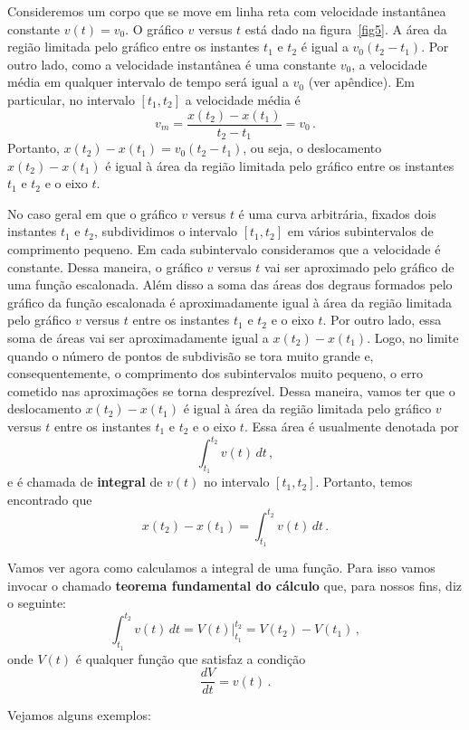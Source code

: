 \documentclass[fontsize=12pt]{scrartcl}
\begin{document}
Consideremos um corpo que se move em linha reta com velocidade
instantânea constante $v(t)=v_0$. O gráfico $v$ versus $t$ está dado
na figura~\ref{fig5}. A área da região limitada pelo gráfico entre os
instantes $t_1$ e $t_2$ é igual a $v_0(t_2-t_1)$. Por outro lado, como
a velocidade instantânea é uma constante $v_0$, a velocidade média em
qualquer intervalo de tempo será igual a $v_0$ (ver apêndice). Em
particular, no intervalo $[t_1,t_2]$ a velocidade média é
$$v_m=\frac{x(t_2)-x(t_1)}{t_2-t_1}=v_0\,.$$
Portanto, $x(t_2)-x(t_1)=v_0(t_2-t_1)$, ou seja, o deslocamento
$x(t_2)-x(t_1)$ é igual à área da região limitada pelo gráfico entre
os instantes $t_1$ e $t_2$ e o eixo $t$.

No caso geral em que o gráfico $v$ versus $t$ é uma curva arbitrária,
fixados dois instantes $t_1$ e $t_2$, subdividimos o intervalo
$[t_1,t_2]$ em vários subintervalos de comprimento pequeno. Em cada
subintervalo consideramos que a velocidade é constante. Dessa maneira,
o gráfico $v$ versus $t$ vai ser aproximado pelo gráfico de uma função
escalonada. Além disso a soma das áreas dos degraus formados pelo
gráfico da função escalonada é aproximadamente igual à área da região
limitada pelo gráfico $v$ versus $t$ entre os instantes $t_1$ e $t_2$
e o eixo $t$. Por outro lado, essa soma de áreas vai ser
aproximadamente igual a $x(t_2)-x(t_1)$. Logo, no limite quando o
número de pontos de subdivisão se tora muito grande e,
consequentemente, o comprimento dos subintervalos muito pequeno, o
erro cometido nas aproximações se torna desprezível. Dessa maneira,
vamos ter que o deslocamento $x(t_2)-x(t_1)$ é igual à área da região
limitada pelo gráfico $v$ versus $t$ entre os instantes $t_1$ e $t_2$
e o eixo $t$. Essa área é usualmente denotada por
$$\int_{t_1}^{t_2}v(t)\,dt\,,$$
e é chamada de \textbf{integral} de $v(t)$ no intervalo
$[t_1,t_2]$. Portanto, temos encontrado que
$$x(t_2)-x(t_1)=\int_{t_1}^{t_2}v(t)\,dt\,.$$

Vamos ver agora como calculamos a integral de uma função. Para isso
vamos invocar o chamado \textbf{teorema fundamental do cálculo} que,
para nossos fins, diz o seguinte:
$$\int_{t_1}^{t_2}v(t)\,dt=V(t)|_{t_1}^{t_2}=V(t_2)-V(t_1)\,,$$
onde $V(t)$ é qualquer função que satisfaz a condição
$$\frac{dV}{dt}=v(t)\,.$$

Vejamos alguns exemplos:
\end{document}
